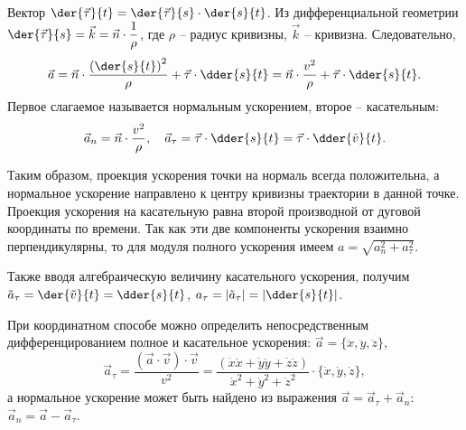 Вектор \( \ds \der{\vec{\tau}}{t} = \der{\vec{\tau}}{s}\cdot\der{s}{t} \). Из
дифференциальной геометрии \( \ds \der{\vec{\tau}}{s} = \vec{k} =
\vec{n}\cdot\frac{1}{\rho} \), где \( \rho \) -- радиус кривизны,
\( \vec{k} \) -- кривизна. Следовательно,
\[
    \vec{a} = \vec{n}\cdot\frac{\left(\der{s}{t}\right)^2}{\rho} + \vec{\tau}
    \cdot\dder{s}{t} = \vec{n}\cdot\frac{v^2}{\rho}+ \vec{\tau}\cdot\dder{s}{t}.
\]
Первое слагаемое называется нормальным ускорением, второе -- касательным:
\[
    \vec{a}_n = \vec{n}\cdot\frac{v^2}{\rho}, \quad \vec{a}_\tau =
    \vec{\tau}\cdot\dder{s}{t} = \vec{\tau}\cdot\dder{\tilde{v}}{t}.
\]

Таким образом, проекция ускорения точки на нормаль всегда положительна, а
нормальное ускорение направлено к центру кривизны траектории в данной точке.
Проекция ускорения на касательную равна второй производной от дуговой координаты
по времени. Так как эти две компоненты ускорения взаимно перпендикулярны, то для
модуля полного ускорения имеем \( a = \sqrt{a_n^2 + a_\tau^2} \).

Также вводя алгебраическую величину касательного ускорения, получим
\( \ds \tilde{a}_\tau = \der{\tilde{v}}{t} = \dder{s}{t} \),
\( \ds a_\tau = |\tilde{a}_\tau| = \left|\dder{s}{t}\right| \).

При координатном способе можно определить непосредственным дифференцированием
полное и касательное ускорения: \( \vec{a} = \bigl\{ \ddot{x}, \ddot{y},
\ddot{z}\bigr\} \),
\[
    \vec{a}_\tau = \frac{(\vec{a}\cdot\vec{v})\cdot\vec{v}}{v^2} = \frac{(
    \dot{x}\ddot{x} + \dot{y}\ddot{y} + \dot{z}\ddot{z})}{\dot{x}^2 + \dot{y}^2
    + \dot{z}^2}\cdot\bigl\{\dot{x}, \dot{y}, \dot{z}\bigr\},
\]
а нормальное ускорение может быть найдено из выражения \( \vec{a} = \vec{a}_\tau
+ \vec{a}_n \): \( \vec{a}_n = \vec{a} - \vec{a}_\tau \).

\newpage
